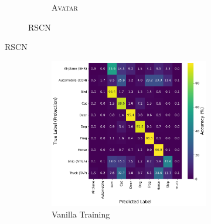 \documentclass[conference]{IEEEtran}
\theoremstyle{definition}
\theoremstyle{remark}
\theoremstyle{proposition}
\begin{document}
\begin{figure}[p!]
\begin{subfigure}{1.0\textwidth}
\begin{subfigure}{.40\textwidth}
            \caption*{\textsc{Avatar}}
    	\end{subfigure}
	\caption{RSCN}
    \end{subfigure}
\end{figure}

\begin{figure}[p!]
    \ContinuedFloat
    \begin{subfigure}{1.0\textwidth}
    \centering
        \begin{subfigure}{.40\textwidth}
    		\centering
    		\includegraphics[width=1.0\textwidth]{combination_attacks/ResNet18_SCNT_t_0_confusion_matrix.png}
            \caption*{Vanilla Training}
    	\end{subfigure}
     \hspace{5em}
        \begin{subfigure}{.40\textwidth}
    		\centering

\end{subfigure}
\end{subfigure}
\end{figure}
\end{document}
